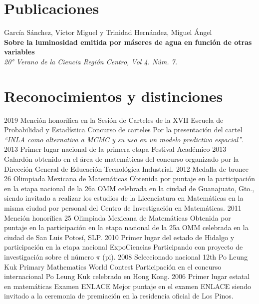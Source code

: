 \documentclass[]{friggeri-cv}
\begin{document}
\section{Publicaciones}
García Sánchez, Víctor Miguel y Trinidad Hernández, Miguel Ángel\\
\textbf{Sobre la luminosidad emitida por máseres de agua en función de otras variables}\\
\emph{20° Verano de la Ciencia Región Centro, Vol 4. Núm. 7.}
\section{Reconocimientos y distinciones}
\begin{entrylist}
  \entry
    {\hspace{0.9cm}2019}
    {Mención honorífica en la Sesión de Carteles de la XVII Escuela de\\Probabilidad y Estadística}
    {Concurso de carteles}
    {Por la presentación del cartel \emph{“INLA como alternativa a MCMC y su uso en un modelo predictivo espacial”}.}
    \entry
    {\hspace{0.9cm}2013}
    {Primer lugar nacional de la primera etapa}
    {Festival Académico 2013}
    {Galardón obtenido en el área de matemáticas del concurso organizado por la Dirección General de Educación Tecnológica Industrial.}
    \entry
    {\hspace{0.9cm}2012}
    {Medalla de bronce}
    {26 Olimpiada Mexicana de Matemáticas}
    {Obtenida por puntaje en la participación en la etapa nacional de la 26a OMM celebrada en la ciudad de Guanajuato, Gto., siendo invitado a realizar los estudios de la Licenciatura en Matemáticas en la misma ciudad por personal del Centro de Investigación  en Matemáticas.}
    \entry
    {\hspace{0.9cm}2011}
    {Mención honorífica}
    {25 Olimpiada Mexicana de Matemáticas}
    {Obtenida por puntaje en la participación en la etapa nacional de la 25a OMM celebrada en la ciudad de San Luis Potosí, SLP.}
    \entry
    {\hspace{0.9cm}2010}
    {Primer lugar del estado de Hidalgo y participación en la etapa nacional}
    {ExpoCiencias}
    {Participando con proyecto de investigación sobre el número $\pi$ (pi).}
    \entry
    {\hspace{0.9cm}2008}
    {Seleccionado nacional}
    {12th Po Leung Kuk Primary Mathematics World Contest}
    {Participación en el concurso internacional Po Leung Kuk celebrado en Hong Kong.}
    \entry
    {\hspace{0.9cm}2006}
    {Primer lugar estatal en matemáticas}
    {Examen ENLACE}
    {Mejor puntaje en el examen ENLACE siendo invitado a la ceremonia de premiación en la residencia oficial de Los Pinos.}
\end{entrylist}

\end{document}
